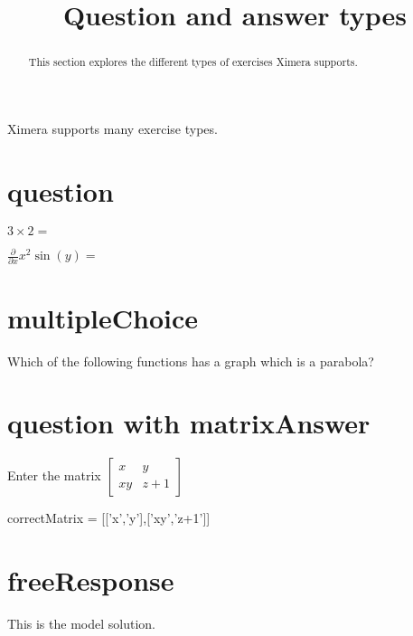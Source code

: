 \documentclass{ximera}
\title{Question and answer types}
\begin{document}
\begin{abstract}
  This section explores the different types of exercises Ximera supports. 
\end{abstract}

\maketitle

Ximera supports many exercise types.


\section{question}

\begin{question}
  $3\times 2 = $ 
\end{question}

\begin{question}
  $ \frac{\partial}{\partial x} x^2\sin(y) = $ 
\end{question}




\section{multipleChoice}

\begin{question}
  Which of the following functions has a graph which is a parabola?
  \begin{multipleChoice}
  \end{multipleChoice}
\end{question}



\section{question with matrixAnswer}

\begin{question}
  Enter the matrix  \(\begin{bmatrix} x & y \\ xy & z+1 \end{bmatrix}\)
  \begin{matrixAnswer}
    correctMatrix = [['x','y'],['xy','z+1']]
  \end{matrixAnswer}
\end{question}


\section{freeResponse}

\begin{freeResponse}
  This is the model solution.
\end{freeResponse}
\end{document}
